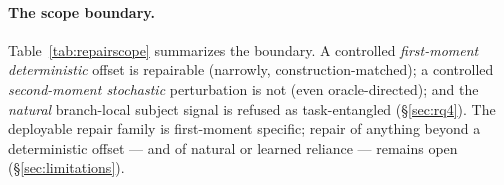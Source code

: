 \begin{table}[t]
\centering\small

\caption{Repair scope matrix. Deployable target-$X$-only repair is confined to first-moment deterministic
offsets; second-moment stochastic perturbations and natural/learned reliance are not repaired.}
\label{tab:repairscope}
\end{table}

\paragraph{The scope boundary.} Table~\ref{tab:repairscope} summarizes the boundary. A controlled
\emph{first-moment deterministic} offset is repairable (narrowly, construction-matched); a controlled
\emph{second-moment stochastic} perturbation is not (even oracle-directed); and the \emph{natural} branch-local
subject signal is refused as task-entangled (\S\ref{sec:rq4}). The deployable repair family is first-moment
specific; repair of anything beyond a deterministic offset --- and of natural or learned reliance --- remains
open (\S\ref{sec:limitations}).
